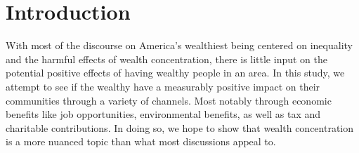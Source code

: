 \section{Introduction}

With most of the discourse on America's wealthiest being centered on inequality and the harmful effects of wealth concentration,
there is little input on the potential positive effects of having wealthy people in an area. In this study, we attempt to see if the wealthy have a measurably 
positive impact on their communities through a variety of channels. Most notably through economic benefits like job opportunities, environmental benefits, as well as tax and charitable contributions.
In doing so, we hope to show that wealth concentration is a more nuanced topic than what most discussions appeal to.